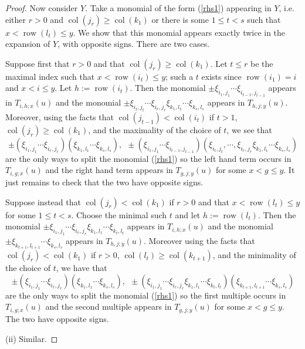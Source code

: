 \documentclass[twoside,12pt,reqno]{amsart}
\def\row{\operatorname{row}}
\def\col{\operatorname{col}}
\begin{document}
\begin{proof}
Now consider $Y$. 
Take a monomial of the form (\ref{rhs1}) appearing in $Y$, i.e.
either $r >0$ and $\col(j_r) \geq \col(k_1)$
or there is some $1 \leq t < s$ such that
$x < \row(l_t) \leq y$.
We show that this monomial appears exactly twice in
the expansion of $Y$, with opposite signs.
There are two cases.

Suppose first that $r >0$ and that $\col(j_r) \geq \col(k_1)$.
Let $t \leq r$ be the maximal index such that
$x < \row(i_t) \leq y$; such a $t$ exists since $\row(i_1)=i$
and $x < i \leq y$.
Let $h := \row(i_t)$.
Then the monomial $\pm \xi_{i_1,j_1}\cdots \xi_{i_{t-1},j_{t-1}}$
appears in $T_{i,h;x}(u)$ and the monomial
$\pm \xi_{i_t,j_t} \cdots \xi_{i_r,j_r}\xi_{k_1,l_1}\cdots\xi_{k_s,l_s}$
appears in $T_{h,j;y}(u)$.
Moreover, using the facts that $\col(j_{t-1}) < \col(i_t)$
if $t > 1$,
$\col(j_r) \geq \col(k_1)$, and the maximality of the choice of $t$,
we see that
$$
\pm(\xi_{i_1,j_1}\cdots \xi_{i_r,j_r})(\xi_{k_1,l_1}\cdots \xi_{k_s,l_s}),\:\:
\pm(\xi_{i_1,j_1}\cdots \xi_{i_{t-1},j_{t-1}})(\xi_{i_t,j_t},\cdots,\xi_{i_r,j_r}\xi_{k_1,l_1}\cdots\xi_{k_s,l_s})
$$
are the only ways to split the monomial (\ref{rhs1}) so the left hand term
occurs in $T_{i,g;x}(u)$ and the right hand term appears in 
$T_{g,j;y}(u)$ for some $x < g \leq y$. It just remains to check that the
two have opposite signs.

Suppose instead that $\col(j_r) < \col(k_1)$ if $r > 0$
and that $x < \row(l_t) \leq y$ for some $1 \leq t < s$.
Choose the minimal such $t$ and 
let $h := \row(l_t)$.
Then the monomial
$\pm \xi_{i_1,j_1}\cdots \xi_{i_r,j_r}
\xi_{k_1,l_1}\cdots\xi_{k_t,l_t}$
appears in $T_{i,h;x}(u)$ and the monomial
$\pm \xi_{k_{t+1},l_{t+1}}\cdots \xi_{k_s,l_s}$
appears in $T_{h,j;y}(u)$.
Moreover using the facts that
$\col(j_r) < \col(k_1)$ if $r > 0$,
$\col(l_t) \geq \col(k_{t+1})$, and the minimality of the choice of $t$,
we have that
$$
\pm(\xi_{i_1,j_1}\cdots \xi_{i_r,j_r})(\xi_{k_1,l_1}\cdots\xi_{k_s,l_s}),\:\:
\pm(\xi_{i_1,j_1}\cdots\xi_{i_r,j_r}\xi_{k_1,l_1}\cdots\xi_{k_t,l_t})(\xi_{k_{t+1},l_{t+1}}\cdots\xi_{k_s,l_s})
$$
are the only ways to split the monomial (\ref{rhs1})
so the first multiple
occurs in $T_{i,g;x}(u)$ and the second multiple appears in 
$T_{g,j;y}(u)$ for some $x < g \leq y$. The
two have opposite signs.

(ii) Similar.


\end{proof}
\end{document}
